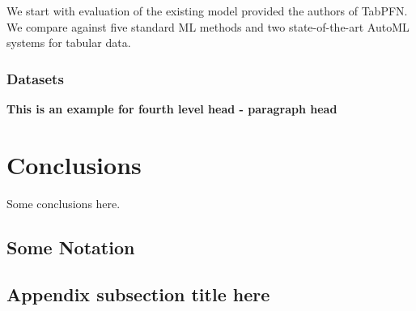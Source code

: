 \documentclass[a4paper]{article}
\newcommand{\subsubsubsection}[1]{%
  \vspace{\baselineskip}%
  \noindent\textbf{#1\\}\quad%
}
\begin{document}
We start with evaluation of the existing model provided the authors of TabPFN.  We compare against five standard ML methods and two state-of-the-art AutoML systems for tabular data.

\subsubsection{Datasets}\label{subsubsec2}
\lipsum[8]

\subsubsubsection{This is an example for fourth level head - paragraph head}
\lipsum[9]


\section{Conclusions}
Some conclusions here.


\printbibliography





\renewcommand\theequation{\Alph{section}\arabic{equation}} %
\renewcommand\thefigure{\Alph{section}\arabic{figure}} %
\renewcommand\thetable{\Alph{section}\arabic{table}} %

\begin{appendices}

\section{Some Notation}
\lipsum[10]

\subsection{Appendix subsection title here}
\lipsum[14]

\end{appendices}
\end{document}
